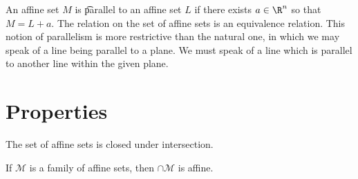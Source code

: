 An affine set $M$ is \t{parallel} to an affine set $L$ if there exists $a \in \R ^n$ so that $M = L + a$.
The relation  on the set of affine sets is an equivalence relation.
This notion of parallelism is more restrictive than the natural one, in which we may speak of a line being parallel to a plane.
We must speak of a line which is parallel to another line within the given plane.

\section*{Properties}

The set of affine sets is closed under intersection.
\begin{proposition}If $\mathcal{M} $ is a family of affine sets, then $\cap \mathcal{M} $ is affine.\end{proposition}

